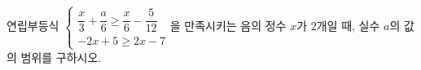연립부등식 $\begin{cases} \dfrac{x}{3}+\dfrac{a}{6}\ge \dfrac{x}{6}-\dfrac{5}{12} \\ -2x+5\ge 2x-7 \end{cases}$을 만족시키는 음의 정수 $x$가 $2$개일 때, 실수 $a$의 값의 범위를 구하시오.
